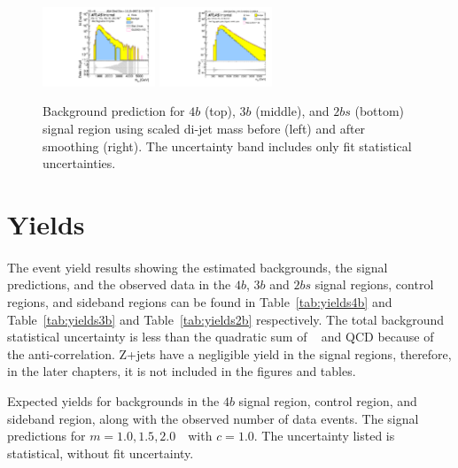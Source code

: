 \begin{figure}[htbp!]
\begin{center}
\includegraphics[width=0.3\textwidth,angle=-90]{figures/boosted/Signal/b77_TwoTag_split_Signal_mHH_pole_1_blind.pdf}
\includegraphics[width=0.3\textwidth,angle=-90]{figures/boosted/Smooth/Moriond_bkg_9_TwoTag_split_pole_Signal_mHH_pole_1_blind.pdf}
\end{center}
\caption{Background prediction for $4b$ (top), $3b$ (middle), and $2bs$ (bottom) signal region using scaled di-jet mass before (left) and after smoothing (right). The uncertainty band includes only fit statistical uncertainties.}
\label{fig:signal-region-mjjscaled-smooth-bkg-noSYS}
\end{figure}

\section{Yields}
\label{sec:yields}
\paragraph{}
The event yield results showing the estimated backgrounds, the signal predictions, and the observed data in the $4b$, $3b$ and $2bs$ signal regions, control regions, and sideband regions can be found in Table~\ref{tab:yields4b} and Table~\ref{tab:yields3b} and Table~\ref{tab:yields2b} respectively. 
The total background statistical uncertainty is less than the quadratic sum of \ttbar~ and QCD because of the anti-correlation.
Z+jets have a negligible yield in the signal regions, therefore, in the later chapters, it is not included in the figures and tables.

\begin{table}[htbp!]
\footnotesize
\begin{center}
\caption{Expected yields for backgrounds in the $4b$ signal region, control region, and sideband region, along with the observed number of data events.  The signal predictions for \Grav $m=1.0, 1.5, 2.0$~\TeV\ with $c=1.0$. The uncertainty listed is statistical, without fit uncertainty.}

\label{tab:yields4b}
\end{center}
\end{table}


